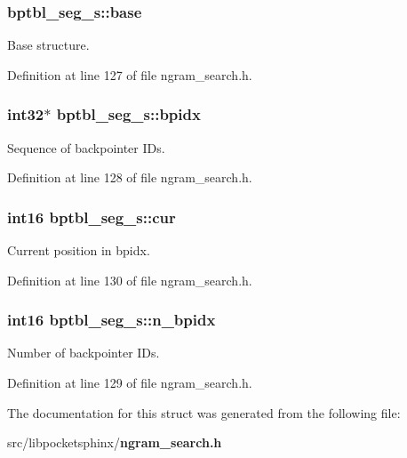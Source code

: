 \subsubsection[{base}]{ bptbl\+\_\+seg\+\_\+s\+::base}\label{structbptbl__seg__s_ac21f715b189c7e452385252bfcee47fe}


Base structure. 



Definition at line 127 of file ngram\+\_\+search.\+h.

\subsubsection[{bpidx}]{\setlength{\rightskip}{0pt plus 5cm}int32$\ast$ bptbl\+\_\+seg\+\_\+s\+::bpidx}\label{structbptbl__seg__s_a81e3d422fb2307c1a83e9490525dce7f}


Sequence of backpointer I\+Ds. 



Definition at line 128 of file ngram\+\_\+search.\+h.

\subsubsection[{cur}]{\setlength{\rightskip}{0pt plus 5cm}int16 bptbl\+\_\+seg\+\_\+s\+::cur}\label{structbptbl__seg__s_a1649196a2c03fb61b31624086ee998b5}


Current position in bpidx. 



Definition at line 130 of file ngram\+\_\+search.\+h.

\subsubsection[{n\+\_\+bpidx}]{\setlength{\rightskip}{0pt plus 5cm}int16 bptbl\+\_\+seg\+\_\+s\+::n\+\_\+bpidx}\label{structbptbl__seg__s_a8d1f0aa7dd09e2d6321a00b68ab6a051}


Number of backpointer I\+Ds. 



Definition at line 129 of file ngram\+\_\+search.\+h.



The documentation for this struct was generated from the following file\+:\begin{DoxyCompactItemize}
\item 
src/libpocketsphinx/{\bf ngram\+\_\+search.\+h}\end{DoxyCompactItemize}
